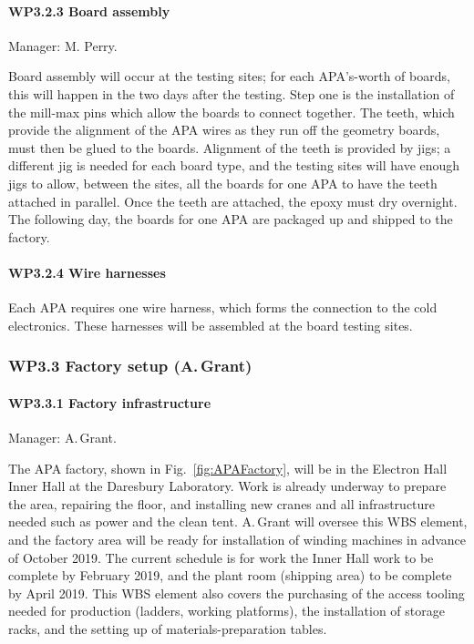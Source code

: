 \paragraph{WP3.2.3 Board assembly}

Manager: M. Perry.

Board assembly will occur at the testing sites; for each APA's-worth of boards, this will happen in the two days after the testing.
Step one is the installation of the mill-max pins which allow the boards to connect together.
The teeth, which provide the alignment of the APA wires as they run off the geometry boards, must then be glued to the boards.  Alignment of the teeth is provided by jigs; a different jig is needed for each board type, and the testing sites will have enough jigs to allow, between the sites, all the boards for one APA to have the teeth attached in parallel. Once the teeth are attached, the epoxy must dry overnight. The following day, the boards for one APA are packaged up and shipped to the factory.

\paragraph{WP3.2.4 Wire harnesses}

Each APA requires one wire harness, which forms the connection to the cold electronics. These harnesses will be assembled at the board testing sites.

\subsubsection{WP3.3 Factory setup (A.\,Grant)}


\paragraph{WP3.3.1 Factory infrastructure} Manager: A.\,Grant.

The APA factory, shown in Fig.~\ref{fig:APAFactory}, will be in the Electron Hall Inner Hall at the Daresbury Laboratory. Work is already underway to prepare the area, repairing the floor, and installing new cranes and all infrastructure needed such as power and the clean tent. A.\,Grant will oversee this WBS element, and the factory area will be ready for installation of winding machines in advance of October 2019. The current schedule is for work the Inner Hall work to be complete by February 2019, and the plant room (shipping area) to be complete by April 2019. This WBS element also covers the purchasing of the access tooling needed for production (ladders, working platforms), the installation of storage racks, and the setting up of materials-preparation tables.

